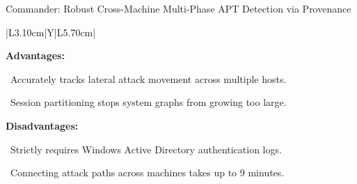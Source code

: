 \begin{frame}[t]{Commander: Robust Cross-Machine Multi-Phase APT Detection via Provenance}
{\begin{tabularx}{\textwidth}{|L{3.10cm}|Y|L{5.70cm}|}
\begin{minipage}[t]{\linewidth}
\textcolor{strengthGreen}{\textbf{Advantages:}}\par\vspace{1.5pt}
\textbullet~Accurately tracks lateral attack movement across multiple hosts.\par\vspace{2.0pt}\textbullet~Session partitioning stops system graphs from growing too large.\par\vspace{4.0pt}
\textcolor{limitRed}{\textbf{Disadvantages:}}\par\vspace{1.5pt}
\textbullet~Strictly requires Windows Active Directory authentication logs.\par\vspace{2.0pt}\textbullet~Connecting attack paths across machines takes up to 9 minutes.\par\vspace{4pt}
\end{minipage} \\\hline
\end{tabularx}}
\end{frame}

